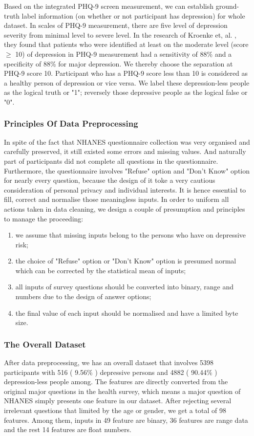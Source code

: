 \documentclass[10pt,journal,compsoc]{IEEEtran}
\begin{document}
Based on the integrated PHQ-9 screen measurement, we can establish ground-truth label information (on whether or not participant has depression) for whole dataset. In scales of PHQ-9 measurement, there are five level of depression severity from minimal level to severe level. In the research of Kroenke et, al. \cite{Kroenke}, they found that patients who were identified at least on the moderate level (score $\geq$ 10) of depression in PHQ-9 measurement had a sensitivity of 88\% and a specificity of 88\% for major depression. We thereby choose the separation at PHQ-9 score 10. Participant who has a PHQ-9 score less than 10 is considered as a healthy person of depression or vice versa. We label these depression-less people as the logical truth or "1"; reversely those depressive people as the logical false or  "0".

\subsubsection{Principles Of Data Preprocessing}
In spite of the fact that NHANES questionnaire collection was very organised and carefully preserved, it still existed some errors and missing values. And naturally part of participants did not complete all questions in the questionnaire. Furthermore,  the questionnaire involves "Refuse" option and "Don't Know" option for nearly every question, because the design of it toke a very cautious consideration of personal privacy and individual interests. It is hence essential to fill, correct and normalise those meaningless inputs. In order to uniform all actions taken in data cleaning, we design a couple of presumption and principles to manage the proceeding:
\begin{enumerate}[label=\alph*)]
	\item	  we assume that missing inputs belong to the persons who have on depressive risk;
	\item   the choice of "Refuse" option or "Don't Know" option is presumed normal which can be corrected by the statistical mean of inputs;
	\item	  all inputs of survey questions should be converted into binary, range and numbers due to the design of answer options;
	\item	  the final value of each input should be normalised and have a limited byte size.\\
\end{enumerate}

\subsubsection{The Overall Dataset}
After data preprocessing, we has an overall dataset that involves 5398 participants with 516 ( 9.56\% ) depressive persons and 4882 ( 90.44\% ) depression-less people among. The features are directly converted from the original major questions in the health survey, which means a major question of NHANES simply presents one feature in our dataset. After rejecting several irrelevant questions that limited by the age or gender, we get a total of 98 features. Among them, inputs in 49 feature are binary, 36 features are range data and the rest 14 features are float numbers. 
\end{document}
